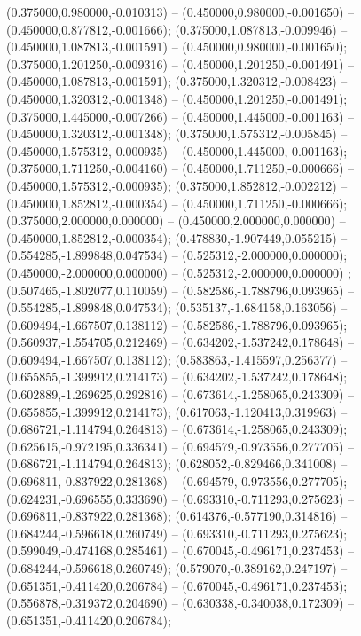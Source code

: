  (0.375000,0.980000,-0.010313) -- (0.450000,0.980000,-0.001650) -- (0.450000,0.877812,-0.001666);
 (0.375000,1.087813,-0.009946) -- (0.450000,1.087813,-0.001591) -- (0.450000,0.980000,-0.001650);
 (0.375000,1.201250,-0.009316) -- (0.450000,1.201250,-0.001491) -- (0.450000,1.087813,-0.001591);
 (0.375000,1.320312,-0.008423) -- (0.450000,1.320312,-0.001348) -- (0.450000,1.201250,-0.001491);
 (0.375000,1.445000,-0.007266) -- (0.450000,1.445000,-0.001163) -- (0.450000,1.320312,-0.001348);
 (0.375000,1.575312,-0.005845) -- (0.450000,1.575312,-0.000935) -- (0.450000,1.445000,-0.001163);
 (0.375000,1.711250,-0.004160) -- (0.450000,1.711250,-0.000666) -- (0.450000,1.575312,-0.000935);
 (0.375000,1.852812,-0.002212) -- (0.450000,1.852812,-0.000354) -- (0.450000,1.711250,-0.000666);
 (0.375000,2.000000,0.000000) -- (0.450000,2.000000,0.000000) -- (0.450000,1.852812,-0.000354);
 (0.478830,-1.907449,0.055215) -- (0.554285,-1.899848,0.047534) -- (0.525312,-2.000000,0.000000);
 (0.450000,-2.000000,0.000000) -- (0.525312,-2.000000,0.000000) ;
 (0.507465,-1.802077,0.110059) -- (0.582586,-1.788796,0.093965) -- (0.554285,-1.899848,0.047534);
 (0.535137,-1.684158,0.163056) -- (0.609494,-1.667507,0.138112) -- (0.582586,-1.788796,0.093965);
 (0.560937,-1.554705,0.212469) -- (0.634202,-1.537242,0.178648) -- (0.609494,-1.667507,0.138112);
 (0.583863,-1.415597,0.256377) -- (0.655855,-1.399912,0.214173) -- (0.634202,-1.537242,0.178648);
 (0.602889,-1.269625,0.292816) -- (0.673614,-1.258065,0.243309) -- (0.655855,-1.399912,0.214173);
 (0.617063,-1.120413,0.319963) -- (0.686721,-1.114794,0.264813) -- (0.673614,-1.258065,0.243309);
 (0.625615,-0.972195,0.336341) -- (0.694579,-0.973556,0.277705) -- (0.686721,-1.114794,0.264813);
 (0.628052,-0.829466,0.341008) -- (0.696811,-0.837922,0.281368) -- (0.694579,-0.973556,0.277705);
 (0.624231,-0.696555,0.333690) -- (0.693310,-0.711293,0.275623) -- (0.696811,-0.837922,0.281368);
 (0.614376,-0.577190,0.314816) -- (0.684244,-0.596618,0.260749) -- (0.693310,-0.711293,0.275623);
 (0.599049,-0.474168,0.285461) -- (0.670045,-0.496171,0.237453) -- (0.684244,-0.596618,0.260749);
 (0.579070,-0.389162,0.247197) -- (0.651351,-0.411420,0.206784) -- (0.670045,-0.496171,0.237453);
 (0.556878,-0.319372,0.204690) -- (0.630338,-0.340038,0.172309) -- (0.651351,-0.411420,0.206784);
